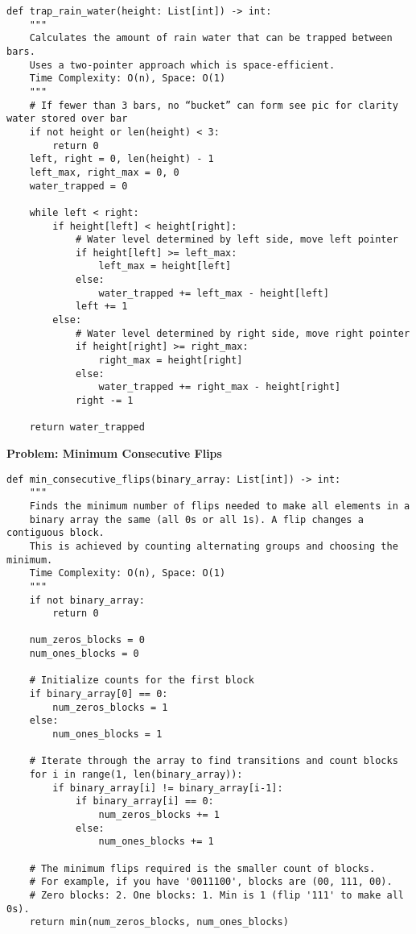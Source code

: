 \begin{verbatim}
def trap_rain_water(height: List[int]) -> int:
    """
    Calculates the amount of rain water that can be trapped between bars.
    Uses a two-pointer approach which is space-efficient.
    Time Complexity: O(n), Space: O(1)
    """    
    # If fewer than 3 bars, no “bucket” can form see pic for clarity water stored over bar
    if not height or len(height) < 3:
        return 0
    left, right = 0, len(height) - 1
    left_max, right_max = 0, 0
    water_trapped = 0

    while left < right:
        if height[left] < height[right]:
            # Water level determined by left side, move left pointer
            if height[left] >= left_max:
                left_max = height[left]
            else:
                water_trapped += left_max - height[left]
            left += 1
        else:
            # Water level determined by right side, move right pointer
            if height[right] >= right_max:
                right_max = height[right]
            else:
                water_trapped += right_max - height[right]
            right -= 1
            
    return water_trapped
\end{verbatim}

\noindent\textbf{Problem: Minimum Consecutive Flips}
\begin{verbatim}
def min_consecutive_flips(binary_array: List[int]) -> int:
    """
    Finds the minimum number of flips needed to make all elements in a
    binary array the same (all 0s or all 1s). A flip changes a contiguous block.
    This is achieved by counting alternating groups and choosing the minimum.
    Time Complexity: O(n), Space: O(1)
    """
    if not binary_array:
        return 0
    
    num_zeros_blocks = 0
    num_ones_blocks = 0

    # Initialize counts for the first block
    if binary_array[0] == 0:
        num_zeros_blocks = 1
    else:
        num_ones_blocks = 1

    # Iterate through the array to find transitions and count blocks
    for i in range(1, len(binary_array)):
        if binary_array[i] != binary_array[i-1]:
            if binary_array[i] == 0:
                num_zeros_blocks += 1
            else:
                num_ones_blocks += 1
    
    # The minimum flips required is the smaller count of blocks.
    # For example, if you have '0011100', blocks are (00, 111, 00).
    # Zero blocks: 2. One blocks: 1. Min is 1 (flip '111' to make all 0s).
    return min(num_zeros_blocks, num_ones_blocks)
\end{verbatim}

